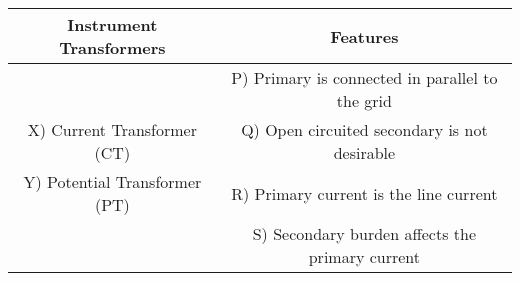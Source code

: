 \begin{tabular}{|c|c|}
        \hline
        \textbf{Instrument Transformers} & \textbf{Features } \\
        
        \hline
          &  P) Primary is connected in parallel to the grid  \\
          \hline
          X) Current Transformer (CT) & Q) Open circuited secondary is not desirable  \\
          \hline
          Y) Potential Transformer (PT)  & R) Primary current is the line current  \\
          \hline
            & S) Secondary burden affects the primary current \\
        \hline
\end{tabular}